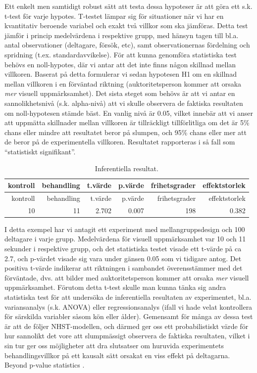 \documentclass[
]{book}
\begin{document}
Ett enkelt men samtidigt robust sätt att testa dessa hypoteser är att göra ett s.k. t-test för varje hypotes. T-testet lämpar sig för situationer när vi har en kvantitativ beroende variabel och exakt två villkor som ska jämföras. Detta test jämför i princip medelvärdena i respektive grupp, med hänsyn tagen till bl.a. antal observationer (deltagare, försök, etc), samt observationernas fördelning och spridning (t.ex. standardavvikelse). För att kunna genomföra statistiska test behövs en noll-hypotes, där vi antar att det inte finns någon skillnad mellan villkoren. Baserat på detta formulerar vi sedan hypotesen H1 om en skillnad mellan villkoren i en förväntad riktning (auktoritetsperson kommer att orsaka \emph{mer} visuell uppmärksamhet). Det sista steget som behövs är att vi antar en sannolikhetsnivå (s.k. alpha-nivå) att vi skulle observera de faktiska resultaten om noll-hypotesen stämde bäst. En vanlig nivå är 0.05, vilket innebär att vi anser att uppmätta skillnader mellan villkoren är tillräckligt tillförlitliga om det är 5\% chans eller mindre att resultatet beror på slumpen, och 95\% chans eller mer att de beror på de experimentella villkoren. Resultatet rapporteras i så fall som ``statistiskt signifikant''.

\begin{longtable}[]{@{}rrrrrr@{}}
\caption{\label{tab:tab-02-08-1-2-01}Inferentiella resultat.}\tabularnewline
\toprule
kontroll & behandling & t.värde & p.värde & frihetsgrader & effektstorlek\tabularnewline
\midrule
\endfirsthead
\toprule
kontroll & behandling & t.värde & p.värde & frihetsgrader & effektstorlek\tabularnewline
\midrule
\endhead
10 & 11 & 2.702 & 0.007 & 198 & 0.382\tabularnewline
\bottomrule
\end{longtable}

I detta exempel har vi antagit ett experiment med mellangruppsdesign och 100 deltagare i varje grupp. Medelvärdena för visuell uppmärksamhet var 10 och 11 sekunder i respektive grupp, och det statistiska testet visade ett t-värde på ca 2.7, och p-värdet visade sig vara under gänsen 0.05 som vi tidigare antog. Det positiva t-värde indikerar att riktningen i sambandet överensstämmer med det förväntade, dvs. att bilder med auktoritetsperson kommer att orsaka \emph{mer} visuell uppmärksamhet. Förutom detta t-test skulle man kunna tänka sig andra statistiska test för att undersöka de inferentiella resultaten av experimentet, bl.a. variansanalys (s.k. ANOVA) eller regressionsanalys (ifall vi hade velat kontrollera för särskilda variabler såsom kön eller ålder). Gemensamt för många av dessa test är att de följer NHST-modellen, och därmed ger oss ett probabilistiskt värde för hur sannolikt det vore att slumpmässigt observera de faktiska resultaten, vilket i sin tur ger oss möjligheter att dra slutsatser om huruvida experimentets behandlingsvillkor på ett kausalt sätt orsakat en viss effekt på deltagarna. Beyond p-value statistics \citep{trafimow2015editorial}.
\end{document}
